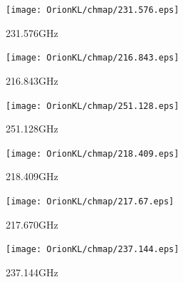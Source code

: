 \begin{figure}[htbp]
  \centering
  \texttt{[image: OrionKL/chmap/231.576.eps]}
  \caption{231.576GHz}
  \label{ap_ch_12}
\end{figure}

\begin{figure}[htbp]
  \centering
  \texttt{[image: OrionKL/chmap/216.843.eps]}
  \caption{216.843GHz}
  \label{ap_ch_13}
\end{figure}


\begin{figure}[htbp]
  \centering
  \texttt{[image: OrionKL/chmap/251.128.eps]}
  \caption{251.128GHz}
  \label{ap_ch_14}
\end{figure}

\begin{figure}[htbp]
  \centering
  \texttt{[image: OrionKL/chmap/218.409.eps]}
  \caption{218.409GHz}
  \label{ap_ch_15}
\end{figure}

\begin{figure}[htbp]
  \centering
  \texttt{[image: OrionKL/chmap/217.67.eps]}
  \caption{217.670GHz}
  \label{ap_ch_16}
\end{figure}

\begin{figure}[htbp]
  \centering
  \texttt{[image: OrionKL/chmap/237.144.eps]}
  \caption{237.144GHz}
  \label{ap_ch_17}
\end{figure}